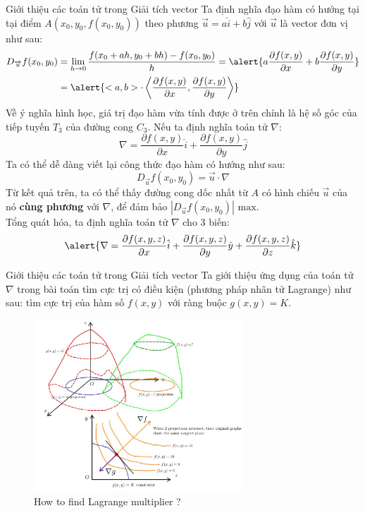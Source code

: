 \documentclass[8pt]{beamer}
\begin{document}
\begin{frame}{Giới thiệu các toán tử trong Giải tích vector}
	Ta định nghĩa đạo hàm có hướng tại tại điểm $A(x_{0},y_{0},f(x_{0},y_{0}))$ theo phương $\overrightarrow{u}=a\hat i+b\hat j$ với $\overrightarrow{u}$ là vector đơn vị như sau:
\begin{equation*}
	\begin{split}
		D_{\overrightarrow{u}}f(x_{0},y_{0})&=\lim_{h\to 0}\frac{f(x_{0}+ah,y_{0}+bh)-f(x_{0},y_{0})}{h}=\alert{a\frac{\partial f(x,y)}{\partial x}+b\frac{\partial f(x,y)}{\partial y}}\\
						    &=\alert{<a,b> \cdot \left<\frac{\partial f(x,y)}{\partial x}, \frac{\partial f(x,y)}{\partial y}\right>}
\end{split}
\end{equation*}
Về ý nghĩa hình học, giá trị đạo hàm vừa tính được ở trên chính là hệ số góc của tiếp tuyến $T_{3}$ của đường cong $C_{3}$. Nếu ta định nghĩa toán tử $\nabla$: $$\nabla=\frac{\partial f(x,y)}{\partial x}\hat i+\frac{\partial f(x,y)}{\partial y}\hat j$$ Ta có thể dễ dàng viết lại công thức đạo hàm có hướng như sau:
$$D_{\overrightarrow{u}}f(x_{0},y_{0})=\overrightarrow{u}\cdot \nabla$$
Từ kết quả trên, ta có thể thấy đường cong dốc nhất từ $A$ có hình chiếu $\overrightarrow{u}$ của nó \textbf{cùng phương} với $\nabla$, để đảm bảo $|D_{\overrightarrow{u}}f(x_{0},y_{0})| \text{ max}$.
\\ Tổng quát hóa, ta định nghĩa toán tử $\nabla$ cho 3 biến:
$$\alert{{\nabla}=\frac{\partial f(x,y,z)}{\partial x}\hat i+\frac{\partial f(x,y,z)}{\partial y}\hat y+\frac{\partial f(x,y,z)}{\partial z}\hat k}$$
\end{frame}
\begin{frame}{Giới thiệu các toán tử trong Giải tích vector}
Ta giới thiệu ứng dụng của toán tử $\nabla$ trong bài toán tìm cực trị có điều kiện (phương pháp nhân tử Lagrange) như sau: tìm cực trị của hàm số $f(x,y)$ với ràng buộc $g(x,y)=K$.
\begin{figure}[h]
			\includegraphics[width=0.7\textwidth]{graph.jpg}
			\caption{How to find Lagrange multiplier ?}			\label{fig:re2}
\end{figure}

\end{frame}
\end{document}
